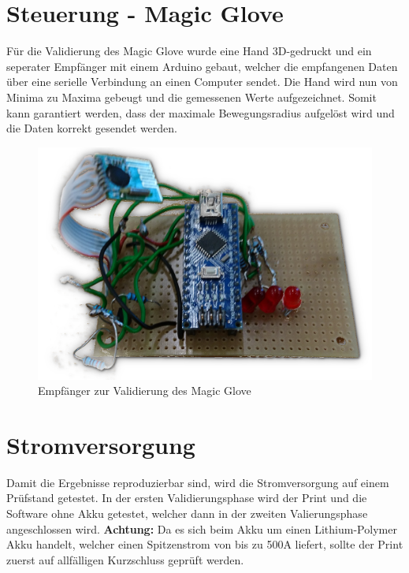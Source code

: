 \section{Steuerung - Magic Glove} \label{ValidSteuerMagicGlove}
Für die Validierung des Magic Glove wurde eine Hand 3D-gedruckt und ein seperater Empfänger mit einem Arduino gebaut, welcher die empfangenen Daten über eine serielle Verbindung an einen Computer sendet. Die Hand wird nun von Minima zu Maxima gebeugt und die gemessenen Werte aufgezeichnet. Somit kann garantiert werden, dass der maximale Bewegungsradius aufgelöst wird und die Daten korrekt gesendet werden.
\begin{figure} [H]
	\centering
	\includegraphics[scale=0.2]{images/receiver}
	\caption{Empfänger zur Validierung des Magic Glove}
	\label{fig:statediagrammbatterie}
\end{figure}
\section{Stromversorgung} \label{ValidStromversorgung}

Damit die Ergebnisse reproduzierbar sind, wird die Stromversorgung auf einem Prüfstand getestet. In der ersten Validierungsphase wird der Print und die Software ohne Akku getestet, welcher dann in der zweiten Valierungsphase angeschlossen wird. \textbf{Achtung:} Da es sich beim Akku um einen Lithium-Polymer Akku handelt, welcher einen Spitzenstrom von bis zu 500A liefert, sollte der Print zuerst auf allfälligen Kurzschluss geprüft werden.   

